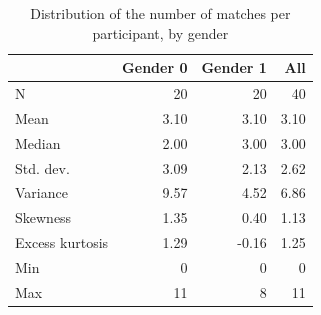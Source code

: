 \begin{table}[htbp]
\centering
\caption{Distribution of the number of matches per participant, by gender}
\label{tab:q1_matches_by_gender}
\begin{tabular}{lrrr}
\toprule
 & Gender 0 & Gender 1 & All \\
\midrule
N & 20 & 20 & 40 \\
Mean & 3.10 & 3.10 & 3.10 \\
Median & 2.00 & 3.00 & 3.00 \\
Std. dev. & 3.09 & 2.13 & 2.62 \\
Variance & 9.57 & 4.52 & 6.86 \\
Skewness & 1.35 & 0.40 & 1.13 \\
Excess kurtosis & 1.29 & -0.16 & 1.25 \\
Min & 0 & 0 & 0 \\
Max & 11 & 8 & 11 \\
\bottomrule
\end{tabular}
\end{table}
